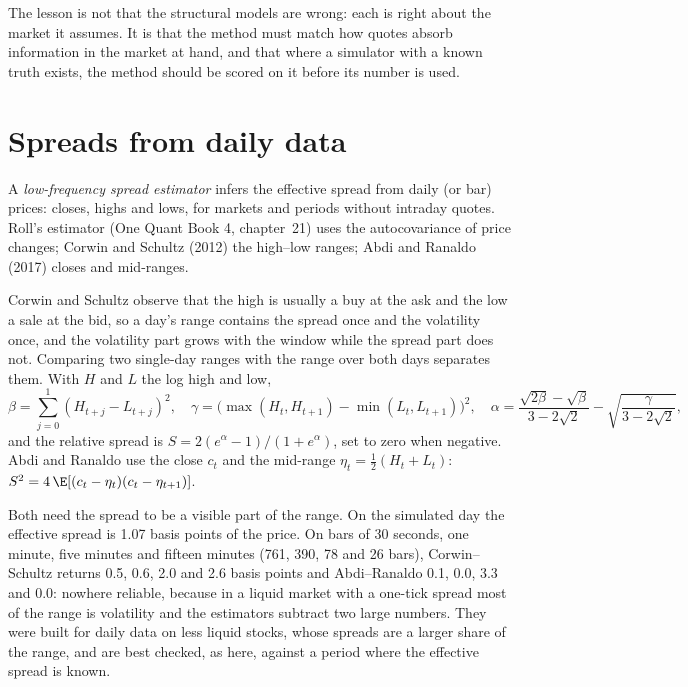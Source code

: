 The lesson is not that the structural models are wrong: each is right about the market it assumes. It is that the method must match how quotes absorb
information in the market at hand, and that where a simulator with a known truth exists, the method should be scored on it before its number is used.

\section{Spreads from daily data}

\begin{definition}\label{def:mx:decomposing-the-spread:lowfreq}
A \emph{low-frequency spread estimator} infers the effective spread from daily (or bar) prices: closes, highs and
lows, for markets and periods without intraday quotes. Roll's estimator (One Quant Book 4, chapter~21) uses the autocovariance of price changes;
Corwin and Schultz (2012) the high--low ranges; Abdi and Ranaldo (2017) closes and mid-ranges.
\end{definition}

Corwin and Schultz observe that the high is usually a buy at the ask and the low a sale at the bid, so a day's range contains the spread once and the
volatility once, and the volatility part grows with the window while the spread part does not. Comparing two single-day ranges with the range over both
days separates them. With $H$ and $L$ the log high and low,
\[
\beta=\sum_{j=0}^{1}(H_{t+j}-L_{t+j})^2,\quad \gamma=\bigl(\max(H_t,H_{t+1})-\min(L_t,L_{t+1})\bigr)^2,\quad
\alpha=\frac{\sqrt{2\beta}-\sqrt\beta}{3-2\sqrt2}-\sqrt{\frac{\gamma}{3-2\sqrt2}},
\]
and the relative spread is $S=2(e^\alpha-1)/(1+e^\alpha)$, set to zero when negative. Abdi and Ranaldo use the close $c_t$ and the mid-range
$\eta_t=\tfrac12(H_t+L_t)$: $S^2=4\,\E[(c_t-\eta_t)(c_t-\eta_{t+1})]$.

Both need the spread to be a visible part of the range. On the simulated day the effective spread is 1.07 basis points of the price. On bars of 30
seconds, one minute, five minutes and fifteen minutes (761, 390, 78 and 26 bars), Corwin--Schultz returns 0.5, 0.6, 2.0 and 2.6 basis points and Abdi--Ranaldo
0.1, 0.0, 3.3 and 0.0: nowhere reliable, because in a liquid market with a one-tick spread most of the range is volatility and the estimators subtract
two large numbers. They were built for daily data on less liquid stocks, whose spreads are a larger share of the range, and are best checked, as here,
against a period where the effective spread is known.

